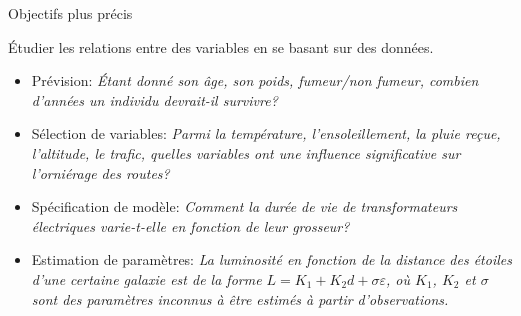 \documentclass{BeamerTemplate}
\begin{document}
\begin{frame}[t]{Objectifs plus précis}

{\small
Étudier les relations entre des variables en se basant sur des données}.

\begin{itemize}

\item \alert{Prévision}: {\scriptsize {\it
\'Etant donné son âge, son poids, fumeur/non fumeur, combien
d'années un individu devrait-il survivre?}}

\item \alert{Sélection de variables}: {\scriptsize {\it
Parmi la température, l'ensoleillement, la pluie re\c{c}ue,
l'altitude, le trafic,  quelles variables ont une influence
significative sur l'orniérage des routes?}}

\item \alert{Spécification de modèle}: {\scriptsize {\it
Comment la durée de vie de transformateurs électriques varie-t-elle
en fonction de leur grosseur?}}

\item \alert{Estimation de paramètres}: {\scriptsize {\it
La luminosité en fonction de la distance des étoiles d'une certaine
galaxie est de la forme $L=K_1+K_2d+\sigma\varepsilon$, où $K_1$, $K_2$ et $\sigma$
sont des paramètres inconnus à être estimés à partir d'observations.}}
\end{itemize}

\end{frame}



\end{document}
